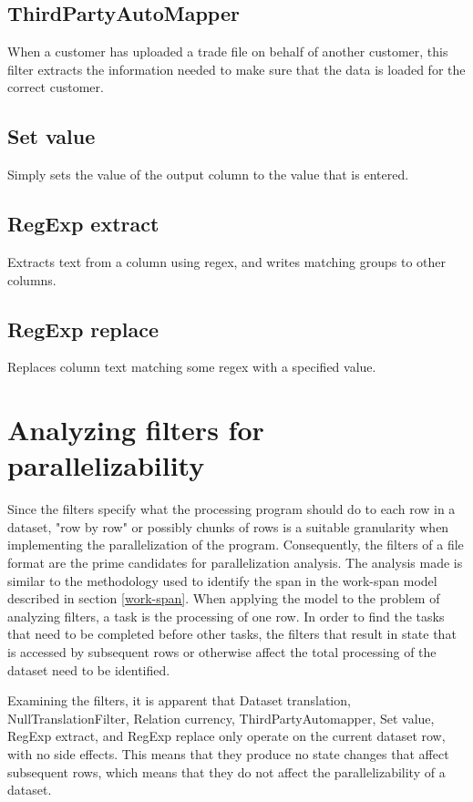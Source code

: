 \subsection{ThirdPartyAutoMapper}
When a customer has uploaded a trade file on behalf of another customer, this filter extracts the information needed to make sure that the data is loaded
for the correct customer.

\subsection{Set value}
Simply sets the value of the output column to the value that is entered.

\subsection{RegExp extract}
Extracts text from a column using regex, and writes matching groups to other columns.

\subsection{RegExp replace}
Replaces column text matching some regex with a specified value.

\section{Analyzing filters for parallelizability}
Since the filters specify what the processing program should do to each row in a dataset, "row by row" or possibly chunks of rows is a suitable
granularity when implementing the parallelization of the program. Consequently, the filters of a file format are the prime candidates
for parallelization analysis. The analysis made is similar to the methodology used to identify the span in the work-span model described in
section \ref{work-span}. When applying the model to the problem of analyzing filters, a task is the processing of one row. In order to find
the tasks that need to be completed before other tasks, the filters that result in state that is accessed by subsequent rows or otherwise
affect the total processing of the dataset need to be identified.

Examining the filters, it is apparent that Dataset translation, NullTranslationFilter, Relation currency,
ThirdPartyAutomapper, Set value, RegExp extract, and RegExp replace only operate on the current dataset row, with no side effects.
This means that they produce no state changes that affect subsequent rows, which means that they do not affect the parallelizability of a dataset.


